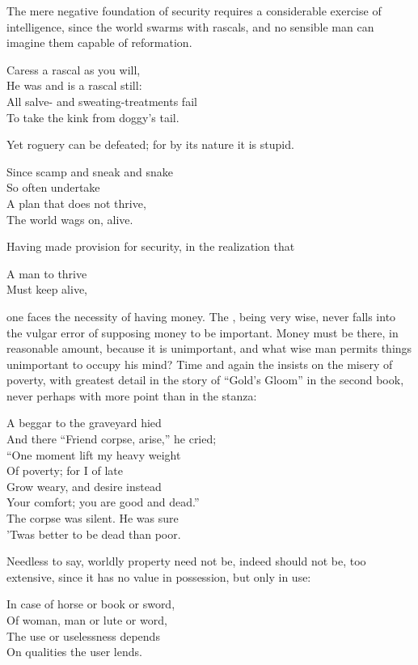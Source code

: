 The mere negative foundation of security requires
a considerable exercise of intelligence, since the world
swarms with rascals, and no sensible man can imagine
them capable of reformation.
\begin{pverse}
Caress a rascal as you will,\\
He was and is a rascal still:\\
All salve- and sweating-treatments fail\\
To take the kink from doggy's tail.
\end{pverse}
Yet roguery can be defeated; for by its nature it is
stupid.
\begin{pverse}
Since scamp and sneak and snake\\
So often undertake\\
A plan that does not thrive,\\
The world wags on, alive.
\end{pverse}
Having made provision for security, in the realization that
\begin{pverse}
A man to thrive\\
Must keep alive,
\end{pverse}
one faces the necessity of having money. The , being
very wise, never falls into the vulgar error of supposing money to be
important. Money must be there, in reasonable amount, because it is
unimportant, and what wise man permits things unimportant to occupy
his mind? Time and again the  insists on the misery
of poverty, with greatest detail in the story of ``Gold's Gloom'' in the
second book, never perhaps with more point than in the stanza:
\begin{pverse}
A beggar to the graveyard hied\\
And there ``Friend corpse, arise,'' he cried;\\
``One moment lift my heavy weight\\
Of poverty; for I of late\\
Grow weary, and desire instead\\
Your comfort; you are good and dead.''\\
The corpse was silent. He was sure\\
'Twas better to be dead than poor.
\end{pverse}

Needless to say, worldly property need not be, indeed should not be,
too extensive, since it has no value in possession, but only in use:
\begin{pverse}
In case of horse or book or sword,\\
Of woman, man or lute or word,\\
The use or uselessness depends\\
On qualities the user lends.
\end{pverse}

